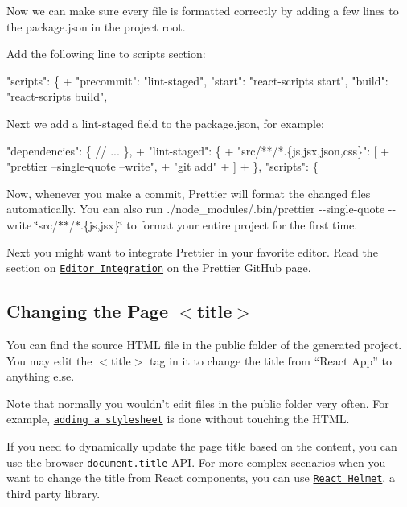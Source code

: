 Now we can make sure every file is formatted correctly by adding a few lines to the {\ttfamily package.\+json} in the project root.

Add the following line to {\ttfamily scripts} section\+:


\begin{DoxyCode}
  "scripts": \{
+   "precommit": "lint-staged",
    "start": "react-scripts start",
    "build": "react-scripts build",
\end{DoxyCode}


Next we add a \textquotesingle{}lint-\/staged\textquotesingle{} field to the {\ttfamily package.\+json}, for example\+:


\begin{DoxyCode}
  "dependencies": \{
    // ...
  \},
+ "lint-staged": \{
+   "src/**/*.\{js,jsx,json,css\}": [
+     "prettier --single-quote --write",
+     "git add"
+   ]
+ \},
  "scripts": \{
\end{DoxyCode}


Now, whenever you make a commit, Prettier will format the changed files automatically. You can also run {\ttfamily ./node\+\_\+modules/.bin/prettier -\/-\/single-\/quote -\/-\/write \char`\"{}src/$\ast$$\ast$/$\ast$.\{js,jsx\}\char`\"{}} to format your entire project for the first time.

Next you might want to integrate Prettier in your favorite editor. Read the section on \href{https://github.com/prettier/prettier#editor-integration}{\tt Editor Integration} on the Prettier Git\+Hub page.

\subsection*{Changing the Page {\ttfamily $<$title$>$}}

You can find the source H\+T\+ML file in the {\ttfamily public} folder of the generated project. You may edit the {\ttfamily $<$title$>$} tag in it to change the title from “\+React App” to anything else.

Note that normally you wouldn’t edit files in the {\ttfamily public} folder very often. For example, \href{#adding-a-stylesheet}{\tt adding a stylesheet} is done without touching the H\+T\+ML.

If you need to dynamically update the page title based on the content, you can use the browser \href{https://developer.mozilla.org/en-US/docs/Web/API/Document/title}{\tt {\ttfamily document.\+title}} A\+PI. For more complex scenarios when you want to change the title from React components, you can use \href{https://github.com/nfl/react-helmet}{\tt React Helmet}, a third party library.

